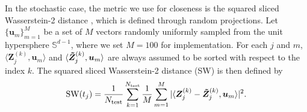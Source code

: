 \documentclass[openacc]{rsproca_new}%
\newcommand{\z}{\bm{z}}
\begin{document}
In the stochastic case, the metric we use for closeness is the squared sliced Wasserstein-2 distance \cite{deshpande2018generative},
which is defined through random projections.
Let $\{\bm{u}_m\}_{m=1}^M$ be a set of 
$M$ vectors randomly uniformly sampled from the unit hypersphere $\mathbb{S}^{d-1}$,
where we set $M = 100$ for implementation. 
For each $j$ and $m$, 
$\langle \bm{Z}_{j}^{(k)},\bm{u}_m \rangle$ 
and $\langle \bm{\Tilde{Z}}_{j}^{(k)}, \bm{u}_m \rangle$ 
are always assumed to be sorted with respect to the index $k$.
The squared sliced Wasserstein-2 distance (SW) is then defined by 
\begin{equation*}
    \text{SW}(t_j) =
    \frac{1}{N_{\text{test}}}
    \sum_{k=1}^{N_{\text{test}}}
    \frac{1}{M}
    \sum_{m=1}^M
    |\langle 
    \bm{Z}_{j}^{(k)} - \bm{\Tilde{Z}}_{j}^{(k)},
    \bm{u}_m
    \rangle|^2.
\end{equation*}
\end{document}
